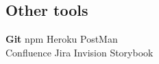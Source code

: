 \documentclass[letterpaper]{deedy-resume} %
\begin{document}
\begin{minipage}[t]{0.33\textwidth}
\subsection{Other tools}
\textbf{Git} \textbullet{} npm \textbullet{} Heroku \textbullet{} PostMan \\
Confluence \textbullet{} Jira \textbullet{} Invision \textbullet{} Storybook \\ 

\sectionspace %
\sectionspace %

\end{minipage} %
\hfill
%
%
\end{document}
